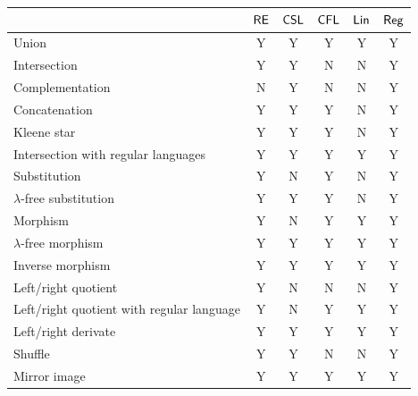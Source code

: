 \begin{center}
\begin{tabular}{ | l | c | c | c | c | c | }
\hline
              & \index{$\RE$}$\RE$
              & \index{$\CSL$}$\CSL$
              & \index{$\CFL$}$\CFL$ 
              & \index{$\Lin$}$\Lin$ 
              & \index{$\Reg$}$\Reg$\\
\hline
\index{union}Union
              & Y     & Y      & Y      & Y      & Y \\
\hline
\index{intersection}Intersection
              & Y     & Y      & N      & N      & Y \\
\hline
\index{complementation}Complementation
              & N     & Y      & N      & N      & Y \\
\hline
\index{concatenation}Concatenation
              & Y     & Y      & Y      & N      & Y \\
\hline
\index{Kleene star}Kleene star
              & Y     & Y      & Y      & N      & Y \\
\hline
\index{intersection!with regular language}Intersection with regular languages
              & Y     & Y      & Y      & Y      & Y \\
\hline
\index{substitution}Substitution
              & Y     & N      & Y      & N      & Y \\
\hline
\index{substitution!$\lambda$-free}$\lambda$-free substitution  
              & Y     & Y      & Y      & N      & Y \\
\hline
\index{morphism}Morphism
              & Y     & N      & Y      & Y      & Y \\
\hline
\index{morphism!$\lambda$-free}$\lambda$-free morphism
              & Y     & Y      & Y      & Y      & Y \\
\hline
\index{morphism!inverse}Inverse morphism
              & Y     & Y      & Y      & Y      & Y \\
\hline
\index{left-quotient}\index{right-quotient}Left/right quotient
              & Y     & N      & N      & N      & Y \\
\hline
\index{left-quotient!with regular language}\index{right-quotient!with regular 
language}Left/right quotient with regular language
              & Y     & N      & Y      & Y      & Y \\
\hline
\index{left-derivate}\index{right-derivate}Left/right derivate
              & Y     & Y      & Y      & Y      & Y \\
\hline
\index{shuffle}Shuffle
              & Y     & Y      & N      & N      & Y \\
\hline
\index{mirror image}Mirror image
              & Y     & Y      & Y      & Y      & Y \\
\hline
\end{tabular}
\end{center}

